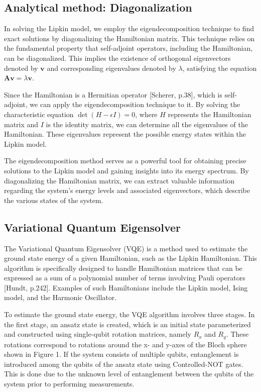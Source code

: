 \documentclass[onecolumn,10pt,cleanfoot]{asme2ej}
\begin{document}
\subsection{Analytical method: Diagonalization}
In solving the Lipkin model, we employ the eigendecomposition technique to find exact solutions by diagonalizing the Hamiltonian matrix. This technique relies on the fundamental property that self-adjoint operators, including the Hamiltonian, can be diagonalized. This implies the existence of orthogonal eigenvectors denoted by $\mathbf{v}$ and corresponding eigenvalues denoted by $\lambda$, satisfying the equation $\mathbf{A} \mathbf{v} = \lambda \mathbf{v}$.

Since the Hamiltonian is a Hermitian operator [Scherer, p.38], which is self-adjoint, we can apply the eigendecomposition technique to it. By solving the characteristic equation $\det(H - \epsilon I) = 0$, where $H$ represents the Hamiltonian matrix and $I$ is the identity matrix, we can determine all the eigenvalues of the Hamiltonian. These eigenvalues represent the possible energy states within the Lipkin model.

The eigendecomposition method serves as a powerful tool for obtaining precise solutions to the Lipkin model and gaining insights into its energy spectrum. By diagonalizing the Hamiltonian matrix, we can extract valuable information regarding the system's energy levels and associated eigenvectors, which describe the various states of the system.


\subsection{Variational Quantum Eigensolver}
The Variational Quantum Eigensolver (VQE) is a method used to estimate the ground state energy of a given Hamiltonian, such as the Lipkin Hamiltonian. This algorithm is specifically designed to handle Hamiltonian matrices that can be expressed as a sum of a polynomial number of terms involving Pauli operators [Hundt, p.242]. Examples of such Hamiltonians include the Lipkin model, Ising model, and the Harmonic Oscillator.

To estimate the ground state energy, the VQE algorithm involves three stages. In the first stage, an ansatz state is created, which is an initial state parameterized and constructed using single-qubit rotation matrices, namely $R_x$ and $R_y$. These rotations correspond to rotations around the x- and y-axes of the Bloch sphere shown in Figure 1. If the system consists of multiple qubits, entanglement is introduced among the qubits of the ansatz state using Controlled-NOT gates. This is done due to the unknown level of entanglement between the qubits of the system prior to performing measurements.
\end{document}
